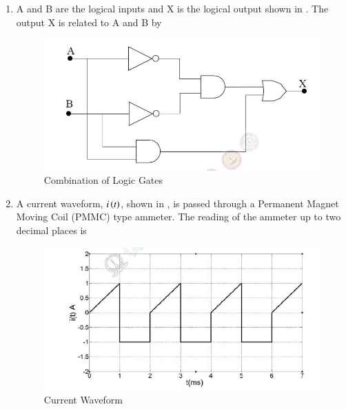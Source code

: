 \documentclass[journal,12pt,onecolumn]{IEEEtran}
\theoremstyle{remark}
\begin{document}
\begin{enumerate}
\item A and B are the logical inputs and X is the logical output shown in . The output X is related to A and B by \par \hfill{}
\begin{figure}[H]
    \centering
    \includegraphics[width=0.6\columnwidth]{Figs/Q-20.png}
    \caption{Combination of Logic Gates}
    \label{fig:placeholder_10}
\end{figure}
\begin{enumerate}
\end{enumerate}

\item A current waveform, $i\left(t\right)$, shown in , is passed through a Permanent Magnet Moving Coil (PMMC) type ammeter. The reading of the ammeter up to two decimal places is \par \hfill{}
\begin{figure}[H]
    \centering
    \includegraphics[width=0.5\columnwidth]{Figs/Q-21.png}
    \caption{Current Waveform}
    \label{fig:placeholder_11}
\end{figure}
\begin{enumerate}
\end{enumerate}


\end{enumerate}
\end{document}
